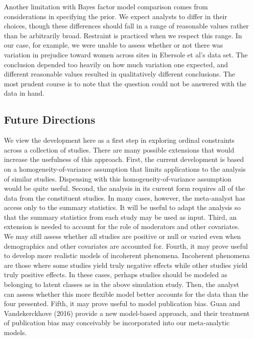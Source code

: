 \documentclass[english,man]{apa6}
\theoremstyle{definition}
\theoremstyle{definition}
\theoremstyle{definition}
\theoremstyle{remark}
\begin{document}
Another limitation with Bayes factor model comparison comes from
considerations in specifying the prior. We expect analysts to differ in
their choices, though these differences should fall in a range of
reasonable values rather than be arbitrarily broad. Restraint is
practiced when we respect this range. In our case, for example, we were
unable to assess whether or not there was variation in prejudice toward
women across sites in Ebersole et al's data set. The conclusion depended
too heavily on how much variation one expected, and different reasonable
values resulted in qualitatively different conclusions. The most prudent
course is to note that the question could not be answered with the data
in hand.

\subsection{Future Directions}\label{future-directions}

We view the development here as a first step in exploring ordinal
constraints across a collection of studies. There are many possible
extensions that would increase the usefulness of this approach. First,
the current development is based on a homogeneity-of-variance assumption
that limits applications to the analysis of similar studies. Dispensing
with this homogeneity-of-variance assumption would be quite useful.
Second, the analysis in its current form requires all of the data from
the constituent studies. In many cases, however, the meta-analyst has
access only to the summary statistics. It will be useful to adapt the
analysis so that the summary statistics from each study may be used as
input. Third, an extension is needed to account for the role of
moderators and other covariates. We may still assess whether all studies
are positive or null or varied even when demographics and other
covariates are accounted for. Fourth, it may prove useful to develop
more realistic models of incoherent phenomena. Incoherent phenomena are
those where some studies yield truly negative effects while other
studies yield truly positive effects. In these cases, perhaps studies
should be modeled as belonging to latent classes as in the above
simulation study. Then, the analyst can assess whether this more
flexible model better accounts for the data than the four presented.
Fifth, it may prove useful to model publication bias. Guan and
Vandekerckhove (2016) provide a new model-based approach, and their
treatment of publication bias may conceivably be incorporated into our
meta-analytic models.
\end{document}
